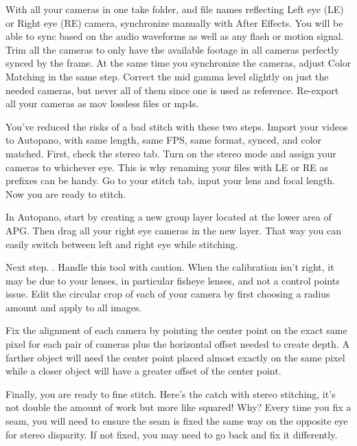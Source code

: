 \begin{fullwidth}
With all your cameras in one take folder, and file names reflecting Left eye (LE) or Right eye (RE) camera, synchronize manually with After Effects. You will be able to sync based on the audio waveforms as well as any flash or motion signal. Trim all the cameras to only have the available footage in all cameras perfectly synced by the frame. At the same time you synchronize the cameras, adjust Color Matching in the same step. Correct the mid gamma level slightly on just the needed cameras, but never all of them since one is used as reference. Re-export all your cameras as mov lossless files or mp4s.


You’ve reduced the risks of a bad stitch with these two steps. Import your videos to Autopano, with same length, same FPS, same format, synced, and color matched. First, check the stereo tab. Turn on the stereo mode and assign your cameras to whichever eye. This is why renaming your files with LE or RE as prefixes can be handy. Go to your stitch tab, input your lens and focal length. Now you are ready to stitch. 


In Autopano, start by creating a new group layer located at the lower area of APG. Then drag all your right eye cameras in the new layer. That way you can easily switch between left and right eye while stitching.


Next step. \textbf{}. Handle this tool with caution. When the calibration isn't right, it may be due to your lenses, in particular fisheye lenses, and not a control points issue. Edit the circular crop of each of your camera by first choosing a radius amount and apply to all images. 


Fix the alignment of each camera by pointing the center point on the exact same pixel for each pair of cameras plus the horizontal offset needed to create depth. A farther object will need the center point placed almost exactly on the same pixel while a closer object will have a greater offset of the center point. 



Finally, you are ready to fine stitch. Here’s the catch with stereo stitching, it’s not double the amount of work but more like squared! Why? Every time you fix a seam, you will need to ensure the seam is fixed the same way on the opposite eye for stereo disparity. If not fixed, you may need to go back and fix it differently. 


\end{fullwidth}
